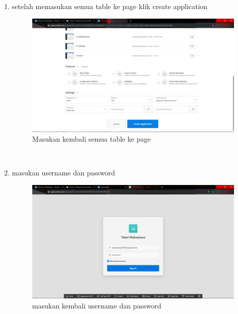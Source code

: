 \begin{enumerate}
\item setelah memasukan semua table ke page klik create application
\begin{figure}[H]
    \centering
    \includegraphics[scale=0.2]{figures/26}
    \caption{ Masukan kembali semua table ke page }
    \label{Automatic4}
\end{figure} \\

\item masukan username dan password
\begin{figure}[H]
    \centering
    \includegraphics[scale=0.2]{figures/27}
    \caption{ masukan kembali username dan password}
    \label{Variable Explorer}
\end{figure} \\


\end{enumerate}
